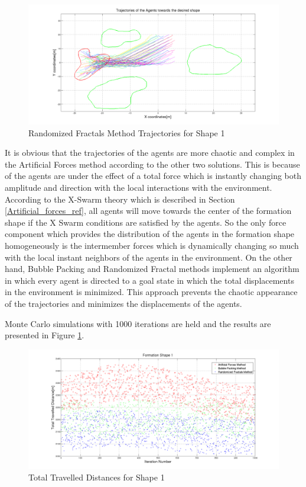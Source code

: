 \begin{figure}[H]
\caption{Randomized Fractals Method Trajectories for Shape 1}
\centerline{\includegraphics[scale = 0.32]{Randomized_Trajectories_1}}
\end{figure} 	
			
It is obvious that the trajectories of the agents are more chaotic and complex in the Artificial Forces method according to the other two solutions. This is because of the agents are under the effect of a total force which is instantly changing both amplitude and direction with the local interactions with the environment. According to the X-Swarm theory which is described in Section \ref{Artificial_forces_ref}, all agents will move towards the center of the formation shape if the X Swarm conditions are satisfied by the agents. So the only force component which provides the distribution of the agents in the formation shape homogeneously is the intermember forces which is dynamically changing so much with the local instant neighbors of the agents in the environment. On the other hand, Bubble Packing and Randomized Fractal methods implement an algorithm in which every agent is directed to a goal state in which the total displacements in the environment is minimized. This approach prevents the chaotic appearance of the trajectories and minimizes the displacements of the agents.

Monte Carlo simulations with 1000 iterations are held and the results are presented in Figure \ref{total_disp_1}. 
		
\begin{figure}[H]
\caption{Total Travelled Distances for Shape 1} \label{total_disp_1}
\centerline{\includegraphics[scale = 0.32]{Total_Energy_Shape_1}}
\end{figure} 	
				
